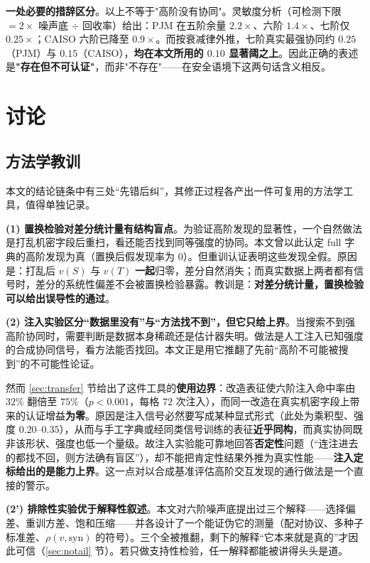 \documentclass[10.5pt,compsoc,UTF8]{CjC}
\theoremstyle{mystyle}
\begin{document}
\textbf{一处必要的措辞区分}。以上不等于"高阶没有协同"。灵敏度分析（可检测下限 $=2\times$ 噪声底 $\div$ 回收率）给出：PJM 在五阶余量 $2.2\times$、六阶 $1.4\times$、七阶仅 $0.25\times$；CAISO 六阶已降至 $0.9\times$。而按衰减律外推，七阶真实最强协同约 $0.25$（PJM）与 $0.15$（CAISO），\textbf{均在本文所用的 $0.10$ 显著阈之上}。因此正确的表述是\textbf{"存在但不可认证"}，而非"不存在"——在安全语境下这两句话含义相反。

\section{\heiti 讨论}

\subsection{方法学教训}

本文的结论链条中有三处“先错后纠”，其修正过程各产出一件可复用的方法学工具，值得单独记录。

\textbf{(1) 置换检验对差分统计量有结构盲点}。为验证高阶发现的显著性，一个自然做法是打乱机密字段后重扫，看还能否找到同等强度的协同。本文曾以此认定 full 字典的高阶发现为真（置换后假发现率为 0）。但重训认证表明这些发现全假。原因是：打乱后 $v(S)$ 与 $v(T)$ \textbf{一起}归零，差分自然消失；而真实数据上两者都有信号时，差分的系统性偏差不会被置换检验暴露。教训是：\textbf{对差分统计量，置换检验可以给出误导性的通过}。

\textbf{(2) 注入实验区分“数据里没有”与“方法找不到”，但它只给上界}。当搜索不到强高阶协同时，需要判断是数据本身稀疏还是估计器失明。做法是人工注入已知强度的合成协同信号，看方法能否找回。本文正是用它推翻了先前“高阶不可能被搜到”的不可能性论证。

然而 \ref{sec:transfer} 节给出了这件工具的\textbf{使用边界}：改造表征使六阶注入命中率由 $32\%$ 翻倍至 $75\%$（$p<0.001$，每格 $72$ 次注入），而同一改造在真实机密字段上带来的认证增益\textbf{为零}。原因是注入信号必然要写成某种显式形式（此处为乘积型、强度 $0.20$--$0.35$），从而与手工字典或经同类信号训练的表征\textbf{近乎同构}，而真实协同既非该形状、强度也低一个量级。故注入实验能可靠地回答\textbf{否定性}问题（“连注进去的都找不回，则方法确有盲区”），却不能把肯定性结果外推为真实性能——\textbf{注入定标给出的是能力上界}。这一点对以合成基准评估高阶交互发现的通行做法是一个直接的警示。

\textbf{(2') 排除性实验优于解释性叙述}。本文对六阶噪声底提出过三个解释——选择偏差、重训方差、饱和压缩——并各设计了一个能证伪它的测量（配对协议、多种子标准差、$\rho(v,\mathrm{syn})$ 的符号）。三个全被推翻，剩下的解释“它本来就是真的”才因此可信（\ref{sec:notail} 节）。若只做支持性检验，任一解释都能被讲得头头是道。
\end{document}
